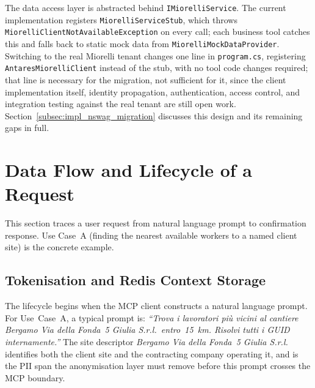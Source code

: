 The data access layer is abstracted behind \texttt{IMiorelliService}. The current implementation registers \texttt{MiorelliServiceStub}, which throws \texttt{MiorelliClientNotAvailableException} on every call; each business tool catches this and falls back to static mock data from \texttt{MiorelliMockDataProvider}. Switching to the real Miorelli tenant changes one line in \texttt{program.cs}, registering \texttt{AntaresMiorelliClient} instead of the stub, with no tool code changes required; that line is necessary for the migration, not sufficient for it, since the client implementation itself, identity propagation, authentication, access control, and integration testing against the real tenant are still open work. Section~\ref{subsec:impl_nswag_migration} discusses this design and its remaining gaps in full.

\section{Data Flow and Lifecycle of a Request}
\label{sec:arch_data_flow}

This section traces a user request from natural language prompt to confirmation response. Use Case~A (finding the nearest available workers to a named client site) is the concrete example.

\subsection{Tokenisation and Redis Context Storage}
\label{subsec:arch_tokenization_redis}

The lifecycle begins when the MCP client constructs a natural language prompt. For Use~Case~A, a typical prompt is: \emph{``Trova i lavoratori più vicini al cantiere Bergamo Via della Fonda~5 Giulia S.r.l.\ entro~15~km. Risolvi tutti i GUID internamente.''} The site descriptor \emph{Bergamo Via della Fonda~5 Giulia S.r.l.} identifies both the client site and the contracting company operating it, and is the PII span the anonymisation layer must remove before this prompt crosses the MCP boundary.

